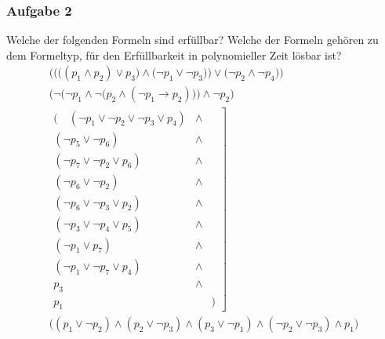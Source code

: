 \documentclass{beamer}
\begin{document}
	\begin{frame} \frametitle{Aufgabe 2}
		\justifying \footnotesize
		Welche der folgenden Formeln sind erfüllbar? 
		Welche der Formeln gehören zu dem Formeltyp, für den Erfüllbarkeit in polynomieller Zeit lösbar ist?
		\begin{gather}
			\bigg( \Big( \big( (p_1 \land p_2) \lor p_3 \big) \land \big( \lnot p_1 \lor \lnot p_3 \big) \Big) \lor \Big( \lnot p_2 \land \lnot p_4 \Big) \bigg)			
			\\
			\bigg( \lnot \Big( \lnot p_1 \land \lnot \big(p_2 \land (\lnot p_1 \to p_2 ) \big) \Big) \land \lnot p_2 \bigg)
			\\
			\left.\begin{array}{rcl}
				\Big(  \quad
				(\lnot p_1 \lor \lnot p_2 \lor \lnot p_3 \lor p_4) & \land & \\
				(\lnot p_5 \lor \lnot p_6) & \land & \\
				(\lnot p_7 \lor \lnot p_2 \lor p_6) & \land & \\
				(\lnot p_6 \lor \lnot p_2) & \land & \\
				(\lnot p_6 \lor \lnot p_3 \lor p_2) & \land & \\
				(\lnot p_3 \lor \lnot p_4 \lor p_5) & \land & \\
				(\lnot p_1 \lor p_7) & \land & \\
				(\lnot p_1 \lor \lnot p_7 \lor p_4) & \land & \\				
				p_3 &\land& \\
				p_1 && \Big)
			\end{array} \right] \\			
			\Big( (p_1 \lor \lnot p_2) \land (p_2 \lor \lnot p_3) \land (p_3 \lor \lnot p_1) \land (\lnot p_2 \lor \lnot p_3) \land p_1 \Big)
		\end{gather}
	\end{frame}
	
\end{document}
